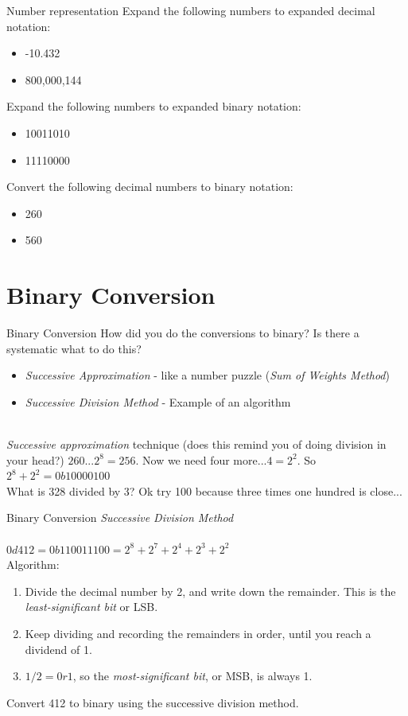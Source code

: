 \documentclass{beamer}
\begin{document}
\begin{frame}{Number representation}
Expand the following numbers to expanded decimal notation:
\begin{itemize}
\item -10.432
\item 800,000,144
\end{itemize}
Expand the following numbers to expanded binary notation:
\begin{itemize}
\item 10011010
\item 11110000
\end{itemize}
Convert the following decimal numbers to binary notation:
\begin{itemize}
\item 260
\item 560
\end{itemize}
\end{frame}

\section{Binary Conversion}

\begin{frame}{Binary Conversion}
How did you do the conversions to binary?  Is there a systematic what to do this? \\
\begin{itemize}
\item \textit{Successive Approximation} - like a number puzzle (\textit{Sum of Weights Method})
\item \textit{Successive Division Method} - Example of an algorithm
\end{itemize}
\hrulefill \\ \vspace{0.5cm}
\textit{Successive approximation} technique (does this remind you of doing division in your head?)
$260$...$2^8 = 256$.  Now we need four more...$4 = 2^2$.  So $2^8 + 2^2 = 0b10000100$ \\ \vspace{0.5cm}
What is 328 divided by 3?  Ok try 100 because three times one hundred is close...
\end{frame}

\begin{frame}{Binary Conversion}
\textit{Successive Division Method} \\ \vspace{0.5cm} \hrulefill \\
$0d412 = 0b110011100 = 2^8 + 2^7 + 2^4 + 2^3 + 2^2$ \\
Algorithm:
\begin{enumerate}
\item Divide the decimal number by 2, and write down the remainder.  This is the \textit{least-significant bit} or LSB.
\item Keep dividing and recording the remainders in order, until you reach a dividend of 1.
\item $1/2 = 0 r 1$, so the \textit{most-significant bit}, or MSB, is always 1.
\end{enumerate}
Convert 412 to binary using the successive division method.
\end{frame}
\end{document}

